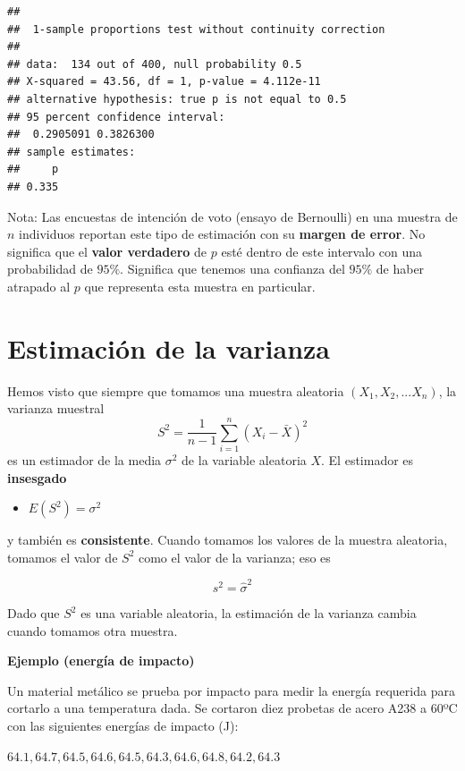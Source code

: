 \documentclass[
]{book}
\providecommand{\tightlist}{%
  \setlength{\itemsep}{0pt}\setlength{\parskip}{0pt}}
\begin{document}
\begin{verbatim}
## 
##  1-sample proportions test without continuity correction
## 
## data:  134 out of 400, null probability 0.5
## X-squared = 43.56, df = 1, p-value = 4.112e-11
## alternative hypothesis: true p is not equal to 0.5
## 95 percent confidence interval:
##  0.2905091 0.3826300
## sample estimates:
##     p 
## 0.335
\end{verbatim}

Nota: Las encuestas de intención de voto (ensayo de Bernoulli) en una muestra de \(n\) individuos reportan este tipo de estimación con su \textbf{margen de error}. No significa que el \textbf{valor verdadero} de \(p\) esté dentro de este intervalo con una probabilidad de \(95\%\). Significa que tenemos una confianza del \(95\%\) de haber atrapado al \(p\) que representa esta muestra en particular.

\hypertarget{estimaciuxf3n-de-la-varianza}{%
\section{Estimación de la varianza}\label{estimaciuxf3n-de-la-varianza}}

Hemos visto que siempre que tomamos una muestra aleatoria \((X_1, X_2, ... X_n)\), la varianza muestral
\[S^2=\frac{1}{n-1}\sum_{i=1}^n (X_i-\bar{X})^2\]
es un estimador de la media \(\sigma^2\) de la variable aleatoria \(X\). El estimador es \textbf{insesgado}

\begin{itemize}
\tightlist
\item
  \(E(S^2)=\sigma^2\)
\end{itemize}

y también es \textbf{consistente}. Cuando tomamos los valores de la muestra aleatoria, tomamos el valor de \(S^2\) como el valor de la varianza; eso es

\[s^2=\hat{\sigma}^2\]

Dado que \(S^2\) es una variable aleatoria, la estimación de la varianza cambia cuando tomamos otra muestra.

\textbf{Ejemplo (energía de impacto)}

Un material metálico se prueba por impacto para medir la energía requerida para cortarlo a una temperatura dada. Se cortaron diez probetas de acero A238 a 60ºC con las siguientes energías de impacto (J):

\(64.1, 64.7, 64.5, 64.6, 64.5, 64.3, 64.6, 64.8, 64.2, 64.3\)
\end{document}
